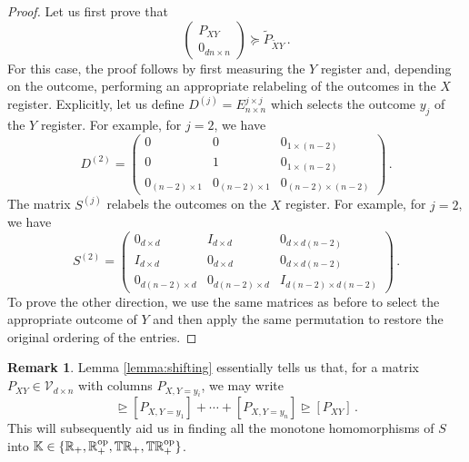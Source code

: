 \documentclass[aps,pra,11pt,onecolumn,nofootinbib,tightenlines]{revtex4-2}
\theoremstyle{definition}
\newtheorem{remark}[theorem]{Remark}
\newcommand{\V}{\mathcal{V}}
\newcommand{\mb}[1]{\mathbb{#1}}
\newcommand{\rgeq}{\trianglerighteq}
\begin{document}
\begin{proof}
Let us first prove that
\begin{equation}
    \begin{pmatrix}
        P_{XY}\\
        0_{dn \times n}
    \end{pmatrix}\succeq\widetilde{P}_{\widetilde{X}Y}\,.
\end{equation}
For this case, the proof follows by first measuring the $Y$ register and, depending on the outcome, performing an appropriate relabeling of the outcomes in the $X$ register.
 Explicitly, let us define $D^{(j)}= E^{j \times j}_{n \times n}$ which selects the outcome $y_j$ of the $Y$ register. For example, for $j=2$, we have
\begin{equation}
    D^{(2)}=\begin{pmatrix}
        0 & 0 & 0_{1 \times (n-2)}  \\
       0 & 1 & 0_{1 \times (n-2)} \\
       0_{(n-2) \times 1} & 0_{(n-2) \times 1} & 0_{(n-2) \times (n-2)}
    \end{pmatrix} \,.
\end{equation}
The matrix $S^{(j)}$ relabels the outcomes on the $X$ register. For example, for $j=2$, we have
\begin{equation}
    S^{(2)}=\begin{pmatrix}
        0_{d \times d} & I_{d \times d} & 0_{d \times d(n-2)} \\
        I_{d \times d} & 0_{d \times d} & 0_{d \times d(n-2)} \\
        0_{d(n-2) \times d} & 0_{d(n-2) \times d} & I_{d(n-2) \times d(n-2)}
    \end{pmatrix} \,.
\end{equation}
To prove the other direction, we use the same matrices as before to select the appropriate outcome of $Y$ and then apply the same permutation to restore the original ordering of the entries.
\end{proof}

\begin{remark}\label{rem:SomOfColumns}
Lemma \ref{lemma:shifting} essentially tells us that, for a matrix $P_{XY}\in\V_{d \times n}$ with columns $P_{X,Y=y_i}$, we may write
\begin{equation}
[P_{XY}]\rgeq[P_{X,Y=y_1}]+\cdots+[P_{X,Y=y_n}]\rgeq [P_{XY}] \,.
\end{equation}
This will subsequently aid us in finding all the monotone homomorphisms of $S$ into $\mb K\in\{\mb R_+,\mb R_+^{\rm op},\mb{TR}_+,\mb{TR}_+^{\rm op}\}$.
\end{remark}
\end{document}
